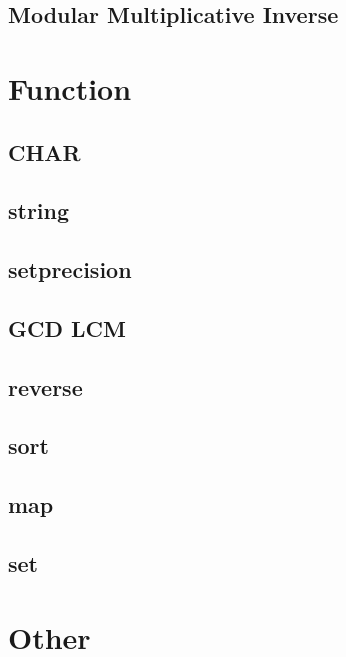         \subsection{Modular Multiplicative Inverse}
                

\section{Function}
        \subsection{CHAR}
                
        \subsection{string}
                
        \subsection{setprecision}
                
        \subsection{GCD LCM}
                
        \subsection{reverse}
                
        \subsection{sort}
                
        \subsection{map}
                
        \subsection{set}
                

\section{Other}
